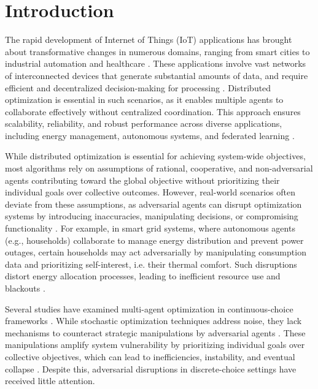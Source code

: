 \documentclass[journal]{IEEEtran}
\begin{document}
\section{Introduction} \label{sec1}
The rapid development of Internet of Things (IoT) applications has brought about transformative changes in numerous domains, ranging from smart cities to industrial automation and healthcare \cite{perwej2019internet}. These applications involve vast networks of interconnected devices that generate substantial amounts of data, and require efficient and decentralized decision-making for processing \cite{ali2018applications}. Distributed optimization is essential in such scenarios, as it enables multiple agents to collaborate effectively without centralized coordination. This approach ensures scalability, reliability, and robust performance across diverse applications, including energy management, autonomous systems, and federated learning \cite{yang2019survey, nedic2009distributed, boyd2011distributed, zhou2021asynchronous, zhou2021graph}.

While distributed optimization is essential for achieving system-wide objectives, most algorithms rely on assumptions of rational, cooperative, and non-adversarial agents contributing toward the global objective without prioritizing their individual goals over collective outcomes. However, real-world scenarios often deviate from these assumptions, as adversarial agents can disrupt optimization systems by introducing inaccuracies, manipulating decisions, or compromising functionality \cite{gupta2020fault, ravi2019case, sundaram2018distributed, lu2020distributed}. For example, in smart grid systems, where autonomous agents (e.g., households) collaborate to manage energy distribution and prevent power outages, certain households may act adversarially by manipulating consumption data and prioritizing self-interest, i.e. their thermal comfort. Such disruptions distort energy allocation processes, leading to inefficient resource use and blackouts \cite{ravi2019case, sundaram2018distributed,  rajabi2021resilience, fanitabasi2018review, Pournaras2016}.

Several studies have examined multi-agent optimization in continuous-choice frameworks \cite{gupta2020fault,ravi2019case, sundaram2018distributed, lu2020distributed, fanitabasi2018review, gonzalez2018multi}. While stochastic optimization techniques address noise, they lack mechanisms to counteract strategic manipulations by adversarial agents \cite{hodgkinson2021multiplicative, spall2012stochastic}. These manipulations amplify system vulnerability by prioritizing individual goals over collective objectives, which can lead to inefficiencies, instability, and eventual collapse \cite{hancock2022avoiding, zan2023adversarial}. Despite this, adversarial disruptions in discrete-choice settings have received little attention.
\end{document}
